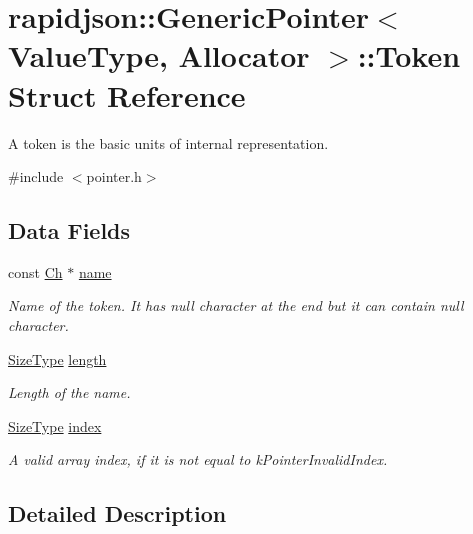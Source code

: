\hypertarget{structrapidjson_1_1_generic_pointer_1_1_token}{}\section{rapidjson\+::Generic\+Pointer$<$ Value\+Type, Allocator $>$\+::Token Struct Reference}
\label{structrapidjson_1_1_generic_pointer_1_1_token}


A token is the basic units of internal representation.  




{\ttfamily \#include $<$pointer.\+h$>$}

\subsection*{Data Fields}
\begin{DoxyCompactItemize}
\item 
const \mbox{\hyperlink{classrapidjson_1_1_generic_pointer_a850f78846c5548565f8395be5f3427b7}{Ch}} $\ast$ \mbox{\hyperlink{structrapidjson_1_1_generic_pointer_1_1_token_aceb59c9796418c20da27b03bf1948fe8}{name}}
\begin{DoxyCompactList}\small\item\em Name of the token. It has null character at the end but it can contain null character. \end{DoxyCompactList}\item 
\mbox{\hyperlink{namespacerapidjson_a44eb33eaa523e36d466b1ced64b85c84}{Size\+Type}} \mbox{\hyperlink{structrapidjson_1_1_generic_pointer_1_1_token_ad866d674dbddf9690ad571b65e968600}{length}}
\begin{DoxyCompactList}\small\item\em Length of the name. \end{DoxyCompactList}\item 
\mbox{\hyperlink{namespacerapidjson_a44eb33eaa523e36d466b1ced64b85c84}{Size\+Type}} \mbox{\hyperlink{structrapidjson_1_1_generic_pointer_1_1_token_a50331c9e3dedc34d2c79745b2e58fb2d}{index}}
\begin{DoxyCompactList}\small\item\em A valid array index, if it is not equal to k\+Pointer\+Invalid\+Index. \end{DoxyCompactList}\end{DoxyCompactItemize}


\subsection{Detailed Description}
